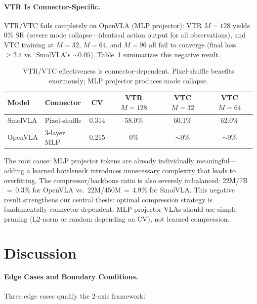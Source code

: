 \documentclass[10pt,twocolumn]{article}
\begin{document}
\paragraph{VTR Is Connector-Specific.}
VTR/VTC fails completely on OpenVLA (MLP projector): VTR $M\!=\!128$ yields 0\% SR (severe mode collapse---identical action output for all observations), and VTC training at $M\!=\!32$, $M\!=\!64$, and $M\!=\!96$ all fail to converge (final loss $\geq 2.4$ vs.\ SmolVLA's ${\sim}0.05$).
Table~\ref{tab:vtr_universality} summarizes this negative result.

\begin{table}[t]
\centering
\caption{VTR/VTC effectiveness is connector-dependent. Pixel-shuffle benefits enormously; MLP projector produces mode collapse.}
\label{tab:vtr_universality}
\small
\begin{tabular}{@{}llcccc@{}}
\toprule
Model & Connector & CV & VTR $M\!=\!128$ & VTC $M\!=\!32$ & VTC $M\!=\!64$ \\
\midrule
SmolVLA & Pixel-shuffle & 0.314 & 58.0\% & 60.1\% & 62.0\% \\
OpenVLA & 3-layer MLP & 0.215 & 0\% & ${\sim}$0\% & ${\sim}$0\% \\
\bottomrule
\end{tabular}
\end{table}

The root cause: MLP projector tokens are already individually meaningful---adding a learned bottleneck introduces unnecessary complexity that leads to overfitting.
The compressor/backbone ratio is also severely imbalanced: 22M/7B$\,=\,$0.3\% for OpenVLA vs.\ 22M/450M$\,=\,$4.9\% for SmolVLA.
This negative result strengthens our central thesis: optimal compression strategy is fundamentally connector-dependent.
MLP-projector VLAs should use simple pruning (L2-norm or random depending on CV), not learned compression.

\section{Discussion}
\label{sec:discussion}

\paragraph{Edge Cases and Boundary Conditions.}
Three edge cases qualify the 2-axis framework:
\end{document}
